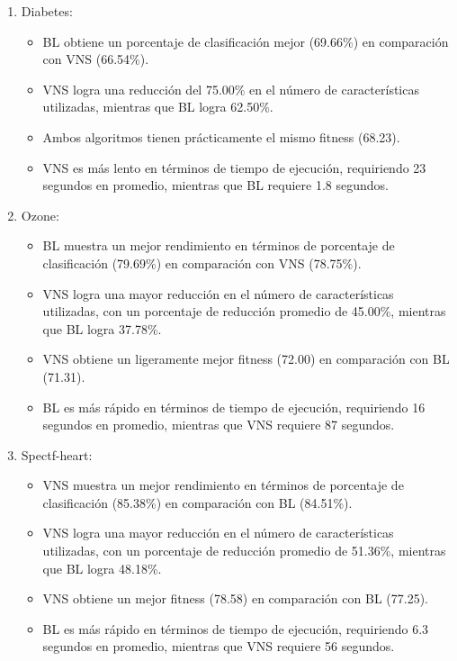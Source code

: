 \begin{enumerate}
\item Diabetes:
\begin{itemize}
\item	BL obtiene un porcentaje de clasificación mejor (69.66\%) en comparación con VNS (66.54\%).
\item	VNS logra una reducción del 75.00\% en el número de características utilizadas, mientras que BL logra 62.50\%.
\item	Ambos algoritmos tienen prácticamente el mismo fitness (68.23).
\item	VNS es más lento en términos de tiempo de ejecución, requiriendo 23 segundos en promedio, mientras que BL requiere 1.8 segundos.
\end{itemize}

\item Ozone:
\begin{itemize}
\item BL muestra un mejor rendimiento en términos de porcentaje de clasificación (79.69\%) en comparación con VNS (78.75\%).
\item VNS logra una mayor reducción en el número de características utilizadas, con un porcentaje de reducción promedio de 45.00\%, mientras que BL logra 37.78\%.
\item VNS obtiene un ligeramente mejor fitness (72.00) en comparación con BL (71.31).
\item BL es más rápido en términos de tiempo de ejecución, requiriendo 16 segundos en promedio, mientras que VNS requiere 87 segundos.
\end{itemize}


\item Spectf-heart:
\begin{itemize}
\item VNS muestra un mejor rendimiento en términos de porcentaje de clasificación (85.38\%) en comparación con BL (84.51\%).
\item VNS logra una mayor reducción en el número de características utilizadas, con un porcentaje de reducción promedio de 51.36\%, mientras que BL logra 48.18\%.
\item VNS obtiene un mejor fitness (78.58) en comparación con BL (77.25).
\item BL es más rápido en términos de tiempo de ejecución, requiriendo 6.3 segundos en promedio, mientras que VNS requiere 56 segundos.
\end{itemize}

\end{enumerate}

